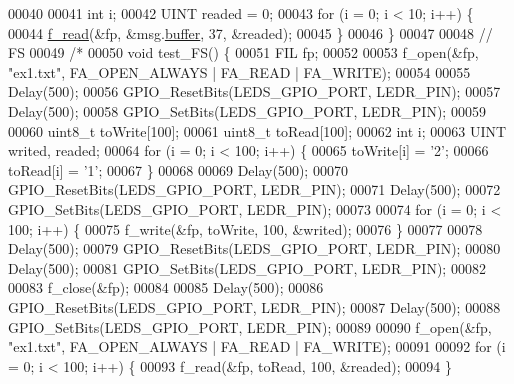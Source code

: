 \begin{DoxyCode}
00040 
00041   \textcolor{keywordtype}{int} i;
00042   UINT readed = 0;
00043   \textcolor{keywordflow}{for} (i = 0; i < 10; i++) \{
00044     \hyperlink{fileSystem_8c_ac4c3dcb6869ca252888eebabe39727b3}{f\_read}(&fp, &msg.\hyperlink{structGPS__MSG_ac486c996a8a7a5edd1752baaea5b4571}{buffer}, 37, &readed);
00045   \}
00046 \}
00047 
00048 \textcolor{comment}{// FS}
00049 \textcolor{comment}{/*}
00050 \textcolor{comment}{void test\_FS() \{}
00051 \textcolor{comment}{  FIL fp;}
00052 \textcolor{comment}{}
00053 \textcolor{comment}{  f\_open(&fp, "ex1.txt", FA\_OPEN\_ALWAYS | FA\_READ | FA\_WRITE);}
00054 \textcolor{comment}{}
00055 \textcolor{comment}{  Delay(500);}
00056 \textcolor{comment}{  GPIO\_ResetBits(LEDS\_GPIO\_PORT, LEDR\_PIN);}
00057 \textcolor{comment}{  Delay(500);}
00058 \textcolor{comment}{  GPIO\_SetBits(LEDS\_GPIO\_PORT, LEDR\_PIN);}
00059 \textcolor{comment}{}
00060 \textcolor{comment}{  uint8\_t toWrite[100];}
00061 \textcolor{comment}{  uint8\_t toRead[100];}
00062 \textcolor{comment}{  int i;}
00063 \textcolor{comment}{  UINT writed, readed;}
00064 \textcolor{comment}{  for (i = 0; i < 100; i++) \{}
00065 \textcolor{comment}{    toWrite[i] = '2';}
00066 \textcolor{comment}{    toRead[i] = '1';}
00067 \textcolor{comment}{  \}}
00068 \textcolor{comment}{}
00069 \textcolor{comment}{  Delay(500);}
00070 \textcolor{comment}{  GPIO\_ResetBits(LEDS\_GPIO\_PORT, LEDR\_PIN);}
00071 \textcolor{comment}{  Delay(500);}
00072 \textcolor{comment}{  GPIO\_SetBits(LEDS\_GPIO\_PORT, LEDR\_PIN);}
00073 \textcolor{comment}{}
00074 \textcolor{comment}{  for (i = 0; i < 100; i++) \{}
00075 \textcolor{comment}{    f\_write(&fp, toWrite, 100, &writed);}
00076 \textcolor{comment}{  \}}
00077 \textcolor{comment}{}
00078 \textcolor{comment}{  Delay(500);}
00079 \textcolor{comment}{  GPIO\_ResetBits(LEDS\_GPIO\_PORT, LEDR\_PIN);}
00080 \textcolor{comment}{  Delay(500);}
00081 \textcolor{comment}{  GPIO\_SetBits(LEDS\_GPIO\_PORT, LEDR\_PIN);}
00082 \textcolor{comment}{}
00083 \textcolor{comment}{  f\_close(&fp);}
00084 \textcolor{comment}{}
00085 \textcolor{comment}{  Delay(500);}
00086 \textcolor{comment}{  GPIO\_ResetBits(LEDS\_GPIO\_PORT, LEDR\_PIN);}
00087 \textcolor{comment}{  Delay(500);}
00088 \textcolor{comment}{  GPIO\_SetBits(LEDS\_GPIO\_PORT, LEDR\_PIN);}
00089 \textcolor{comment}{}
00090 \textcolor{comment}{  f\_open(&fp, "ex1.txt", FA\_OPEN\_ALWAYS | FA\_READ | FA\_WRITE);}
00091 \textcolor{comment}{}
00092 \textcolor{comment}{  for (i = 0; i < 100; i++) \{}
00093 \textcolor{comment}{    f\_read(&fp, toRead, 100, &readed);}
00094 \textcolor{comment}{  \}}

\end{DoxyCode}
